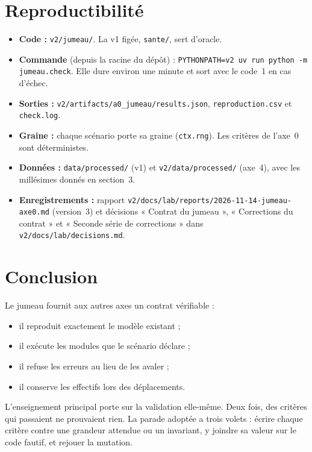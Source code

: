 \documentclass[11pt]{article}
\begin{document}
\section{Reproductibilité}
\begin{itemize}
  \item \textbf{Code :} \texttt{v2/jumeau/}. La v1 figée, \texttt{sante/}, sert d'oracle.
  \item \textbf{Commande} (depuis la racine du dépôt) :
        \texttt{PYTHONPATH=v2 uv run python -m jumeau.check}. Elle dure environ une minute et sort
        avec le code~1 en cas d'échec.
  \item \textbf{Sorties :} \texttt{v2/artifacts/a0\_jumeau/results.json}, \texttt{reproduction.csv}
        et \texttt{check.log}.
  \item \textbf{Graine :} chaque scénario porte sa graine (\texttt{ctx.rng}). Les critères de l'axe~0
        sont déterministes.
  \item \textbf{Données :} \texttt{data/processed/} (v1) et \texttt{v2/data/processed/} (axe~4), avec
        les millésimes donnés en section~3.
  \item \textbf{Enregistrements :} rapport \texttt{v2/docs/lab/reports/2026-11-14-jumeau-axe0.md}
        (version~3) et décisions « Contrat du jumeau », « Corrections du contrat » et « Seconde série
        de corrections » dans \texttt{v2/docs/lab/decisions.md}.
\end{itemize}

\section{Conclusion}
Le jumeau fournit aux autres axes un contrat vérifiable :
\begin{itemize}
  \item il reproduit exactement le modèle existant ;
  \item il exécute les modules que le scénario déclare ;
  \item il refuse les erreurs au lieu de les avaler ;
  \item il conserve les effectifs lors des déplacements.
\end{itemize}
L'enseignement principal porte sur la validation elle-même. Deux fois, des critères qui passaient
ne prouvaient rien. La parade adoptée a trois volets : écrire chaque critère contre une grandeur
attendue ou un invariant, y joindre sa valeur sur le code fautif, et rejouer la mutation.
\end{document}
